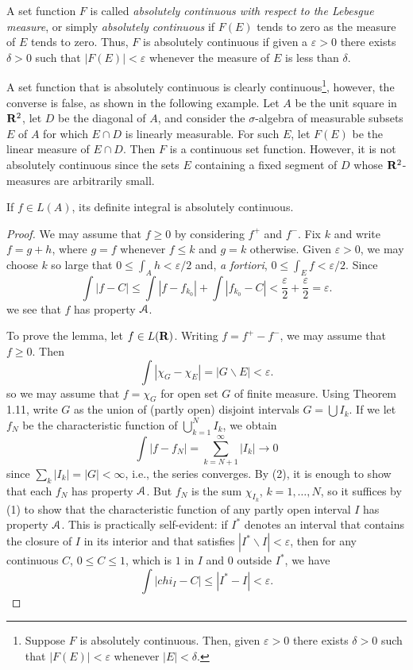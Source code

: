 A set function $F$ is called \emph{absolutely continuous with respect to
  the Lebesgue measure}, or simply \emph{absolutely continuous} if $F(E)$
tends to zero as the measure of $E$ tends to zero. Thus, $F$ is absolutely
continuous if given a $\varepsilon>0$ there exists $\delta>0$ such that
$|F(E)|<\varepsilon$ whenever the measure of $E$ is less than $\delta$.

A set function that is absolutely continuous is clearly
continuous\footnote{Suppose $F$ is absolutely continuous. Then, given
  $\varepsilon>0$ there exists $\delta>0$ such that $|F(E)|<\varepsilon$
  whenever $|E|<\delta$.}, however, the converse is false, as shown in the
following example. Let $A$ be the unit square in $\mathbf{R}^2$, let $D$ be the
diagonal of $A$, and consider the $\sigma$-algebra of measurable subsets
$E$ of $A$ for which $E\cap D$ is linearly measurable. For such $E$, let
$F(E)$ be the linear measure of $E\cap D$. Then $F$ is a continuous set
function. However, it is not absolutely continuous since the sets $E$
containing a fixed segment of $D$ whose $\mathbf{R}^2$-measures are arbitrarily
small.

\begin{theorem}[7.1]
If $f\in L(A)$, its definite integral is absolutely continuous.
\end{theorem}
\begin{proof}
We may assume that $f\geq 0$ by considering $f^+$ and $f^-$. Fix $k$ and
write $f=g+h$, where $g=f$ whenever $f\leq k$ and $g=k$ otherwise. Given
$\varepsilon>0$, we may choose $k$ so large that $0\leq\int_A
h<\varepsilon/2$ and, \emph{a fortiori}, $0\leq\int_E f<\varepsilon/2$.
Since
\[
\int|f-C|\leq\int|f-f_{k_0}|+\int|f_{k_0}-C|<\frac{\varepsilon}{2}+\frac{\varepsilon}{2}=\varepsilon.
\]
we see that $f$ has property $\mathcal{A}$.

To prove the lemma, let $f\in L(\mathbf{R})$. Writing $f=f^+-f^-$, we may assume
that $f\geq 0$. Then
\[
\int|\chi_G-\chi_E|=|G\smallsetminus E|<\varepsilon.
\]
so we may assume that $f=\chi_G$ for open set $G$ of finite measure. Using
Theorem 1.11, write $G$ as the union of (partly open) disjoint intervals
$G=\bigcup I_k$. If we let $f_N$ be the characteristic function of
$\bigcup_{k=1}^N I_k$, we obtain
\[
\int|f-f_N|=\sum_{k=N+1}^\infty|I_k|\to 0
\]
since $\sum_k|I_k|=|G|<\infty$, i.e., the series converges. By (2), it is
enough to show that each $f_N$ has property $\mathcal{A}$. But $f_N$ is the sum
$\chi_{I_k}$, $k=1,\dotsc,N$, so it suffices by (1) to show that the
characteristic function of any partly open interval $I$ has property
$\mathcal{A}$. This is practically self-evident: if $I^*$ denotes an interval
that contains the closure of $I$ in its interior and that satisfies
$|I^*\smallsetminus I|<\varepsilon$, then for any continuous $C$, $0\leq
C\leq 1$, which is $1$ in $I$ and $0$ outside $I^*$, we have
\[
\int|chi_I-C|\leq|I^*-I|<\varepsilon.
\]
\end{proof}

